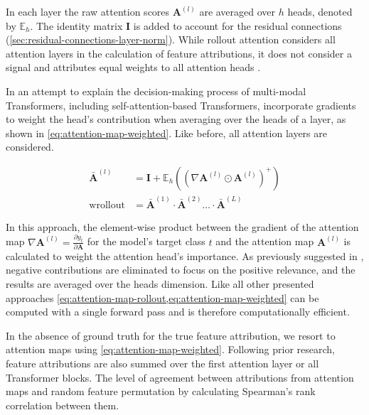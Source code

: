 In each layer the raw attention scores $\mathbf{A}^{(l)}$ are averaged over $h$ heads, denoted by $\mathbb{E}_h$. The identity matrix $\mathbf{I}$ is added to account for the residual connections (\cref{sec:residual-connections-layer-norm}). While rollout attention considers all attention layers in the calculation of feature attributions, it does not consider a signal and attributes equal weights to all attention heads \autocite[][786]{cheferTransformerInterpretabilityAttention2021}.

In an attempt to explain the decision-making process of multi-modal Transformers, including self-attention-based Transformers, \textcite[][3]{cheferTransformerInterpretabilityAttention2021} incorporate gradients to weight the head's contribution when averaging over the heads of a layer, as shown in \cref{eq:attention-map-weighted}. Like before, all attention layers are considered.

\begin{equation}
    \begin{aligned}
        \bar{\mathbf{A}}^{(l)}   & =\mathbf{I} + \mathbb{E}_h\left(\left(\nabla \mathbf{A}^{(l)} \odot \mathbf{A}^{(l)}\right)^{+}\right) \\
        \operatorname {wrollout} & =\bar{\mathbf{A}}^{(1)} \cdot \bar{\mathbf{A}}^{(2)} \ldots \cdot \bar{\mathbf{A}}^{(L)}
    \end{aligned}
    \label{eq:attention-map-weighted}
\end{equation}

In this approach, the element-wise product between the gradient of the attention map $\nabla \mathbf{A}^{(l)}=\frac{\partial y_t}{\partial \mathbf{A}}$ for the model's target class $t$ and the attention map $\mathbf{A}^{(l)}$ is calculated to weight the attention head's importance. As previously suggested in \textcite[][786]{cheferTransformerInterpretabilityAttention2021}, negative contributions are eliminated to focus on the positive relevance, and the results are averaged over the heads dimension. Like all other presented approaches \cref{eq:attention-map-rollout,eq:attention-map-weighted} can be computed with a single forward pass and is therefore computationally efficient.

In the absence of ground truth for the true feature attribution, we resort to attention maps using \cref{eq:attention-map-weighted}. Following prior research, feature attributions are also summed over the first attention layer or all Transformer blocks. The level of agreement between attributions from attention maps and random feature permutation by calculating Spearman's rank correlation between them.

